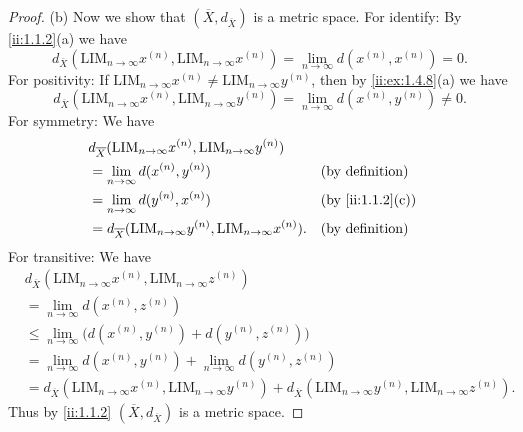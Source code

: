 \begin{proof}{(b)}
  Now we show that \((\overline{X}, d_{\overline{X}})\) is a metric space.
  For identify:
  By \cref{ii:1.1.2}(a) we have
  \[
    d_{\overline{X}}(\text{LIM}_{n \to \infty} x^{(n)}, \text{LIM}_{n \to \infty} x^{(n)}) = \lim_{n \to \infty} d(x^{(n)}, x^{(n)}) = 0.
  \]
  For positivity:
  If \(\text{LIM}_{n \to \infty} x^{(n)} \neq \text{LIM}_{n \to \infty} y^{(n)}\), then by \cref{ii:ex:1.4.8}(a) we have
  \[
    d_{\overline{X}}(\text{LIM}_{n \to \infty} x^{(n)}, \text{LIM}_{n \to \infty} y^{(n)}) = \lim_{n \to \infty} d(x^{(n)}, y^{(n)}) \neq 0.
  \]
  For symmetry:
  We have
  \begin{align*}
     & d_{\overline{X}}(\text{LIM}_{n \to \infty} x^{(n)}, \text{LIM}_{n \to \infty} y^{(n)})                                \\
     & = \lim_{n \to \infty} d(x^{(n)}, y^{(n)})                                                 &  & \text{(by definition)} \\
     & = \lim_{n \to \infty} d(y^{(n)}, x^{(n)})                                                 &  & \by{ii:1.1.2}[c]          \\
     & = d_{\overline{X}}(\text{LIM}_{n \to \infty} y^{(n)}, \text{LIM}_{n \to \infty} x^{(n)}). &  & \text{(by definition)}
  \end{align*}
  For transitive:
  We have
  \begin{align*}
     & d_{\overline{X}}(\text{LIM}_{n \to \infty} x^{(n)}, \text{LIM}_{n \to \infty} z^{(n)})                                                                                             \\
     & = \lim_{n \to \infty} d(x^{(n)}, z^{(n)})                                                                                                                                          \\
     & \leq \lim_{n \to \infty} \big(d(x^{(n)}, y^{(n)}) + d(y^{(n)}, z^{(n)})\big)                                                                                                       \\
     & = \lim_{n \to \infty} d(x^{(n)}, y^{(n)}) + \lim_{n \to \infty} d(y^{(n)}, z^{(n)})                                                                                                \\
     & = d_{\overline{X}}(\text{LIM}_{n \to \infty} x^{(n)}, \text{LIM}_{n \to \infty} y^{(n)}) + d_{\overline{X}}(\text{LIM}_{n \to \infty} y^{(n)}, \text{LIM}_{n \to \infty} z^{(n)}).
  \end{align*}
  Thus by \cref{ii:1.1.2} \((\overline{X}, d_{\overline{X}})\) is a metric space.
\end{proof}

